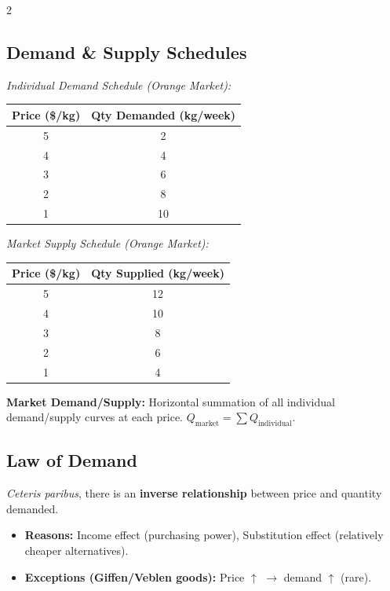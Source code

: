 \documentclass[10pt,a4paper]{article}
\begin{document}
\begin{multicols}{2}
\subsection*{Demand \& Supply Schedules}
\textit{Individual Demand Schedule (Orange Market):}
\begin{center}
\begin{tabular}{|c|c|}
\hline
Price (\$/kg) & Qty Demanded (kg/week) \\
\hline
5 & 2 \\
4 & 4 \\
3 & 6 \\
2 & 8 \\
1 & 10 \\
\hline
\end{tabular}
\end{center}
\textit{Market Supply Schedule (Orange Market):}
\begin{center}
\begin{tabular}{|c|c|}
\hline
Price (\$/kg) & Qty Supplied (kg/week) \\
\hline
5 & 12 \\
4 & 10 \\
3 & 8 \\
2 & 6 \\
1 & 4 \\
\hline
\end{tabular}
\end{center}
\textbf{Market Demand/Supply:} Horizontal summation of all individual demand/supply curves at each price. $Q_{\text{market}} = \sum Q_{\text{individual}}$.

\subsection*{Law of Demand}
\textit{Ceteris paribus}, there is an \textbf{inverse relationship} between price and quantity demanded.
\begin{itemize}[leftmargin=*,nosep]
    \item \textbf{Reasons:} Income effect (purchasing power), Substitution effect (relatively cheaper alternatives).
    \item \textbf{Exceptions (Giffen/Veblen goods):} Price $\uparrow$ $\to$ demand $\uparrow$ (rare).
\end{itemize}


\end{multicols}
\end{document}
